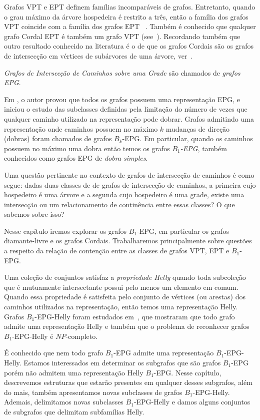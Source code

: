 Grafos VPT e EPT definem famílias incomparáveis de grafos. Entretanto, quando o grau máximo da árvore hospedeira é restrito a três, então a família dos grafos VPT coincide com a família dos grafos EPT~ \cite{golumbic1985edge%
}. Também é conhecido que qualquer grafo Cordal EPT é também um grafo VPT (see~\cite{syslo1985triangulated}). Recordando também que outro resultado conhecido na literatura é o de que os grafos Cordais são os grafos de intersecção em vértices de subárvores de uma árvore, ver~\cite{gavril1974intersection}.


\textit{Grafos de Intersecção de Caminhos sobre uma Grade} são chamados de \textit{grafos EPG}. 

Em \cite{golumbic2009}, o autor provou que todos os grafos possuem uma representação EPG, e iniciou o estudo das subclasses definidas pela limitação do número de vezes que qualquer caminho utilizado na representação pode dobrar. Grafos admitindo uma representação onde caminhos possuem no máximo  $k$ mudanças de direção (dobras) foram chamados de grafos $B_k$-EPG. 
 Em particular, quando os caminhos possuem no máximo uma dobra então temos os grafos \textit{ $B_1$-EPG}, também conhecidos como grafos EPG de  \textit{dobra simples}.

Uma questão pertinente no contexto de grafos de intersecção de caminhos é como segue: dadas duas classes de de grafos de intersecção de caminhos,  a primeira cujo hospedeiro é uma árvore e a segunda cujo hospedeiro é uma grade, existe uma intersecção ou um relacionamento de continência entre essas classes? O que sabemos sobre isso?

Nesse capítulo iremos explorar os grafos  $B_1$-EPG, em particular os grafos diamante-livre e os grafos Cordais. Trabalharemos principalmente sobre questões a respeito da relação de contenção entre as classes de grafos VPT, EPT e $B_1$-EPG.

Uma coleção de conjuntos satisfaz a   \textit{propriedade Helly} quando toda subcoleção que é mutuamente intersectante possui pelo menos um elemento em comum. Quando essa propriedade é satisfeita pelo conjunto de vértices (ou arestas) dos caminhos utilizados na representação, então temos uma representação Helly. Grafos   $B_1$-EPG-Helly foram estudados em~\cite{bornstein2019}, que mostraram que todo grafo admite uma representação Helly e também que o problema de reconhecer grafos $B_1$-EPG-Helly é $NP$-completo.  

É conhecido que nem todo grafo $B_1$-EPG admite uma representação  $B_1$-EPG-Helly. Estamos interessados em determinar os subgrafos que são grafos
$B_1$-EPG porém não admitem uma representação  Helly $B_1$-EPG. Nesse capítulo, descrevemos estruturas que estarão presentes em qualquer desses subgrafos, além do mais, também apresentamos novas subclasses de grafos  $B_1$-EPG-Helly. Ademais, delimitamos novas subclasses $B_1$-EPG-Helly e damos alguns  conjuntos de subgrafos que delimitam subfamílias Helly.
